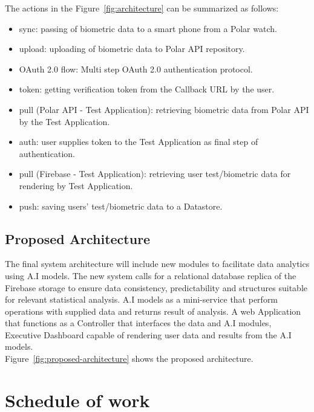 \documentclass{report}
\begin{document}
        The actions in the Figure~\ref{fig:architecture} can be summarized as follows:
        \begin{itemize}
            \item{sync}: passing of biometric data to a smart phone from a Polar watch.
            \item {upload}: uploading of biometric data to Polar API repository.
            \item {OAuth 2.0 flow}: Multi step OAuth 2.0 authentication protocol. 
            \item {token}: getting verification token from the Callback URL by the user.
            \item {pull (Polar API - Test Application)}: retrieving biometric data from Polar API by the Test Application.
            \item {auth}: user supplies token to the Test Application as final step of authentication. 
            \item {pull (Firebase - Test Application)}: retrieving user test/biometric data for rendering by Test Application.
            \item {push}: saving users' test/biometric data to a Datastore.
        \end{itemize}
    \subsection*{Proposed Architecture}
    The final system architecture will include new modules to facilitate data analytics using A.I models. The new system calls 
    for a relational database replica of the Firebase storage to ensure data consistency, predictability and structures suitable
    for relevant statistical analysis. A.I models as a mini-service that perform operations with supplied data and returns result
    of analysis. A web Application that functions as a Controller that interfaces the data and A.I modules, Executive Dashboard 
    capable of rendering user data and results from the A.I models.\\
    Figure~\ref{fig:proposed-architecture} shows the proposed architecture.
    \section*{Schedule of work}
    \printbibliography
\end{document}
